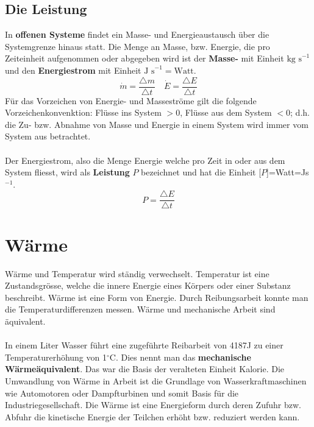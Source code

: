 \subsection{Die Leistung}
In \textbf{offenen Systeme} findet ein Masse- und Energieaustausch über die Systemgrenze hinaus statt. Die Menge an Masse, bzw. Energie, die pro Zeiteinheit aufgenommen oder abgegeben wird ist der \textbf{Masse-} mit Einheit $\text{kg s}^{-1}$ und den \textbf{Energiestrom} mit Einheit $\text{J s}^{-1}=\text{Watt}$.
\begin{equation}
\boxed{\dot{m}=\dfrac{\triangle m}{\triangle t}}\quad 
\boxed{\dot{E}=\dfrac{\triangle E}{\triangle t}}
\end{equation}
Für das Vorzeichen von Energie- und Masseströme gilt die folgende Vorzeichenkonvenktion: Flüsse ins System $>0$, Flüsse aus dem System $<0$; d.h. die Zu- bzw. Abnahme von Masse und Energie in einem System wird immer vom System aus betrachtet.
\\\\
Der Energiestrom, also die Menge Energie welche pro Zeit in oder aus dem System fliesst, wird als \textbf{Leistung} $P$ bezeichnet und hat die Einheit [$P$]=Watt=Js$^{-1}$.
\begin{equation}
\boxed{P=\dfrac{\triangle E}{\triangle t}}
\end{equation}
\section{Wärme}
Wärme und Temperatur wird ständig verwechselt. Temperatur ist eine Zustandsgrösse, welche die innere Energie eines Körpers oder einer Substanz beschreibt. Wärme ist eine Form von Energie. Durch Reibungsarbeit konnte man die Temperaturdifferenzen messen. Wärme und mechanische Arbeit sind äquivalent.
\\\\
In einem Liter Wasser führt eine zugeführte Reibarbeit von 4187J zu einer Temperaturerhöhung von 1$^{\circ}$C. Dies nennt man das \textbf{mechanische Wärmeäquivalent}. Das war die Basis der veralteten Einheit Kalorie. Die Umwandlung von Wärme in Arbeit ist die Grundlage von Wasserkraftmaschinen wie Automotoren oder Dampfturbinen und somit Basis für die Industriegesellschaft. Die Wärme ist eine Energieform durch deren Zufuhr bzw. Abfuhr die kinetische Energie der Teilchen erhöht bzw. reduziert werden kann.
